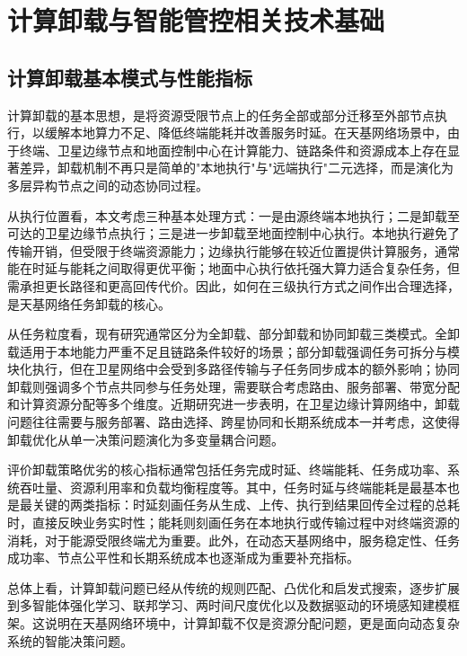 \section{计算卸载与智能管控相关技术基础}

\subsection{计算卸载基本模式与性能指标}

计算卸载的基本思想，是将资源受限节点上的任务全部或部分迁移至外部节点执行，以缓解本地算力不足、降低终端能耗并改善服务时延。在天基网络场景中，由于终端、卫星边缘节点和地面控制中心在计算能力、链路条件和资源成本上存在显著差异，卸载机制不再只是简单的"本地执行"与"远端执行"二元选择，而是演化为多层异构节点之间的动态协同过程\cite{Zhou2024MobilityAware,Zhong2025HeterogeneousTVT}。

从执行位置看，本文考虑三种基本处理方式：一是由源终端本地执行；二是卸载至可达的卫星边缘节点执行；三是进一步卸载至地面控制中心执行。本地执行避免了传输开销，但受限于终端资源能力；边缘执行能够在较近位置提供计算服务，通常能在时延与能耗之间取得更优平衡；地面中心执行依托强大算力适合复杂任务，但需承担更长路径和更高回传代价。因此，如何在三级执行方式之间作出合理选择，是天基网络任务卸载的核心。

从任务粒度看，现有研究通常区分为全卸载、部分卸载和协同卸载三类模式。全卸载适用于本地能力严重不足且链路条件较好的场景；部分卸载强调任务可拆分与模块化执行，但在卫星网络中会受到多路径传输与子任务同步成本的额外影响；协同卸载则强调多个节点共同参与任务处理，需要联合考虑路由、服务部署、带宽分配和计算资源分配等多个维度\cite{Qu2024E2E,Tang2024TwoTimescaleJSAC}。近期研究进一步表明，在卫星边缘计算网络中，卸载问题往往需要与服务部署、路由选择、跨星协同和长期系统成本一并考虑，这使得卸载优化从单一决策问题演化为多变量耦合问题\cite{Tang2024TwoTimescaleJSAC,Feng2026LatencyAware}。

评价卸载策略优劣的核心指标通常包括任务完成时延、终端能耗、任务成功率、系统吞吐量、资源利用率和负载均衡程度等。其中，任务时延与终端能耗是最基本也是最关键的两类指标：时延刻画任务从生成、上传、执行到结果回传全过程的总耗时，直接反映业务实时性；能耗则刻画任务在本地执行或传输过程中对终端资源的消耗，对于能源受限终端尤为重要\cite{Zhou2024MobilityAware,Zhang2024PeerOffloading}。此外，在动态天基网络中，服务稳定性、任务成功率、节点公平性和长期系统成本也逐渐成为重要补充指标\cite{Fan2025SEI,Zhong2025HeterogeneousTVT}。

总体上看，计算卸载问题已经从传统的规则匹配、凸优化和启发式搜索，逐步扩展到多智能体强化学习、联邦学习、两时间尺度优化以及数据驱动的环境感知建模框架\cite{Li2024MARLComCom,Xiu2025MARATD3,Rao2025DiffusionLyapunov,Feng2026LatencyAware}。这说明在天基网络环境中，计算卸载不仅是资源分配问题，更是面向动态复杂系统的智能决策问题。

